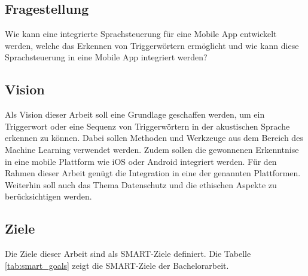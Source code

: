 \documentclass[11pt,a4paper]{article}
\begin{document}
\subsection{Fragestellung}
Wie kann eine integrierte Sprachsteuerung für eine Mobile App entwickelt werden, welche
das Erkennen von Triggerwörtern ermöglicht und wie kann diese Sprachsteuerung in eine
Mobile App integriert werden?


\subsection{Vision}
Als Vision dieser Arbeit soll eine Grundlage geschaffen werden, um ein Triggerwort
oder eine Sequenz von Triggerwörtern in der akustischen Sprache erkennen zu können.
Dabei sollen Methoden und Werkzeuge aus dem Bereich des Machine Learning verwendet werden.
Zudem sollen die gewonnenen Erkenntnise in eine mobile Plattform wie iOS oder Android integriert
werden. Für den Rahmen dieser Arbeit genügt die Integration in eine der genannten Plattformen.
Weiterhin soll auch das Thema Datenschutz und die ethischen Aspekte zu berücksichtigen werden.

\subsection{Ziele}
Die Ziele dieser Arbeit sind als SMART-Ziele definiert. Die Tabelle \ref{tab:smart_goals} zeigt 
die SMART-Ziele der Bachelorarbeit.
\end{document}

